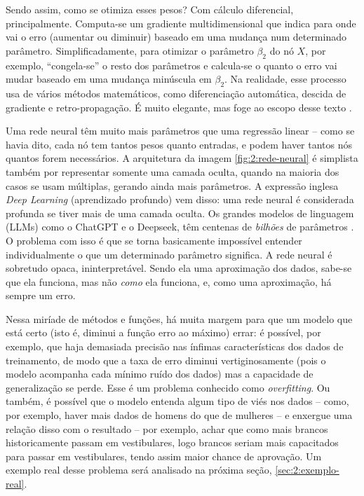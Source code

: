 Sendo assim, como se otimiza esses pesos?
Com cálculo diferencial, principalmente.
Computa-se um gradiente multidimensional que indica para onde vai o erro (aumentar ou diminuir) baseado em uma mudança num determinado parâmetro.
Simplificadamente, para otimizar o parâmetro $\beta_2$ do nó $X$, por exemplo, ``congela-se'' o resto dos parâmetros e calcula-se o quanto o erro vai mudar baseado em uma mudança minúscula em $\beta_2$.
Na realidade, esse processo usa de vários métodos matemáticos, como diferenciação automática, descida de gradiente e retro-propagação.
É muito elegante, mas foge ao escopo desse texto \cite{james_introduction_2021a}.

Uma rede neural têm muito mais parâmetros que uma regressão linear -- como se havia dito, cada nó tem tantos pesos quanto entradas, e podem haver tantos nós quantos forem necessários.
A arquitetura da imagem \ref{fig:2:rede-neural} é simplista também por representar somente uma camada oculta, quando na maioria dos casos se usam múltiplas, gerando ainda mais parâmetros.
A expressão inglesa \textit{Deep Learning} (aprendizado profundo) vem disso: uma rede neural é considerada profunda se tiver mais de uma camada oculta.
Os grandes modelos de linguagem (LLMs) como o ChatGPT e o Deepseek, têm centenas de \textit{bilhões} de parâmetros \cite{deepseek-ai_deepseekv3_2025}.
O problema com isso é que se torna basicamente impossível entender individualmente o que um determinado parâmetro significa.
A rede neural é sobretudo opaca, ininterpretável.
Sendo ela uma aproximação dos dados, sabe-se que ela funciona, mas não \textit{como} ela funciona, e, como uma aproximação, há sempre um erro.

Nessa miríade de métodos e funções, há muita margem para que um modelo que está certo (isto é, diminui a função erro ao máximo) errar:
é possível, por exemplo, que haja demasiada precisão nas ínfimas características dos dados de treinamento, de modo que a taxa de erro diminui vertiginosamente (pois o modelo acompanha cada mínimo ruído dos dados) mas a capacidade de generalização se perde. Esse é um problema conhecido como \textit{overfitting}.
Ou também, é possível que o modelo entenda algum tipo de viés nos dados -- como, por exemplo, haver mais dados de homens do que de mulheres -- e enxergue uma relação disso com o resultado -- por exemplo, achar que como mais brancos historicamente passam em vestibulares, logo brancos seriam mais capacitados para passar em vestibulares, tendo assim maior chance de aprovação.
Um exemplo real desse problema será analisado na próxima seção, \ref{sec:2:exemplo-real}.

